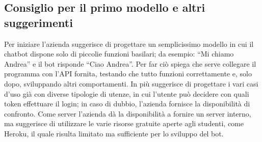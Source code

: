 \subsection{Consiglio per il primo modello e altri suggerimenti}
Per iniziare l’azienda suggerisce di progettare un semplicissimo modello in cui il chatbot dispone solo di piccolie funzioni basilari; da esempio: ``Mi chiamo Andrea'' e il bot risponde ``Ciao Andrea''. Per far ciò spiega che serve collegare il programma con l'API fornita, testando che tutto funzioni correttamente e, solo dopo, sviluppando altri comportamenti.\newline
In più suggerisce di progettare i vari casi d’uso già con diverse tipologie di utenze, in cui l’utente può decidere con quali token effettuare il login; in caso di dubbio, l’azienda fornisce la disponibilità di confronto.
Come server l’azienda dà la disponibilità a fornire un server interno, ma suggerisce di utilizzare le varie risorse gratuite aperte agli studenti, come Heroku, il quale risulta limitato ma sufficiente per lo sviluppo del bot.
